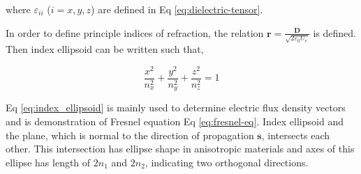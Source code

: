 \documentclass[thesis]{deutez}
\begin{document}
    where $\varepsilon_{ii}$ ($i=x,y,z$) are defined in Eq \ref{eq:dielectric-tensor}. 

    In order to define principle indices of refraction, the relation $\mathbf{r}=\frac{\mathbf{D}}{\sqrt{2\varepsilon_0U_e}}$ is defined. Then index ellipsoid can be written such that,

    \begin{equation}
        \frac{x^2}{n_x^2}+\frac{y^2}{n_y^2}+\frac{z^2}{n_z^2}=1
        \label{eq:index_ellipsoid}
    \end{equation}


    Eq \ref{eq:index_ellipsoid} is mainly used to determine electric flux density vectors and is demonstration of Fresnel equation Eq \ref{eq:fresnel-eq}. Index ellipsoid and the plane, which is normal to the direction of propagation $\mathbf{s}$, intersects each other. This intersection has ellipse shape in anisotropic materials and axes of this ellipse has length of $2n_1$ and $2n_2$, indicating two orthogonal directions. 
\end{document}
